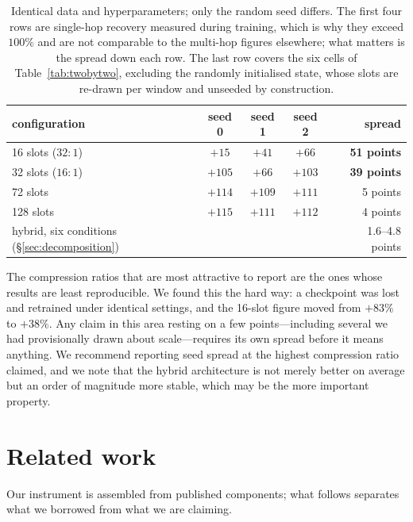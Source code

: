 \documentclass[11pt]{article}
\begin{document}
\begin{table}[ht]
\centering
\begin{tabular}{lccccr}
\toprule
configuration & seed 0 & seed 1 & seed 2 & & spread \\
\midrule
16 slots ($32{:}1$) & $+15$ & $+41$ & $+66$ & & \textbf{51 points} \\
32 slots ($16{:}1$) & $+105$ & $+66$ & $+103$ & & \textbf{39 points} \\
72 slots & $+114$ & $+109$ & $+111$ & & 5 points \\
128 slots & $+115$ & $+111$ & $+112$ & & 4 points \\
\midrule
hybrid, six conditions (\S\ref{sec:decomposition}) & & & & & 1.6--4.8 points \\
\bottomrule
\end{tabular}
\caption{Identical data and hyperparameters; only the random seed differs. The
first four rows are single-hop recovery measured during training, which is why
they exceed $100\%$ and are not comparable to the multi-hop figures elsewhere;
what matters is the spread down each row. The last row covers the six cells of
Table~\ref{tab:twobytwo}, excluding the randomly initialised state, whose slots
are re-drawn per window and unseeded by construction.}
\label{tab:variance}
\end{table}

The compression ratios that are most attractive to report are the ones whose
results are least reproducible. We found this the hard way: a checkpoint was
lost and retrained under identical settings, and the 16-slot figure moved from
$+83\%$ to $+38\%$. Any claim in this area resting on a few points---including
several we had provisionally drawn about scale---requires its own spread before
it means anything. We recommend reporting seed spread at the highest compression
ratio claimed, and we note that the hybrid architecture is not merely better on
average but an order of magnitude more stable, which may be the more important
property.

\section{Related work}
\label{sec:related}

Our instrument is assembled from published components; what follows separates
what we borrowed from what we are claiming.
\end{document}
